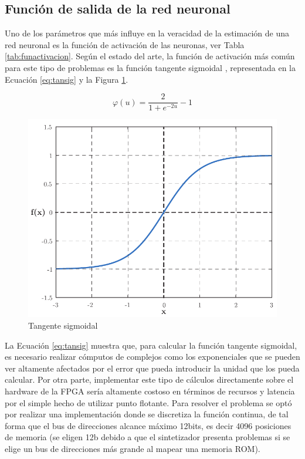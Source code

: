 \subsection{Función de salida de la red neuronal}

Uno de los parámetros que más influye en la veracidad de la estimación de una red neuronal es la función de activación de las neuronas, ver Tabla \ref{tab:funactivacion}. Según el estado del arte, la función de activación más común para este tipo de problemas es la función tangente sigmoidal \citep{floodfc1}, representada en la Ecuación \ref{eq:tansig} y la Figura \ref{fig:tansig}.

\begin{equation}\label{eq:tansig}
\varphi(u) = \dfrac{2}{1+e^{-2u}}-1
\end{equation}

\begin{figure}[H]
\centering
\includegraphics[scale=0.8]{./Figures/TANSIG.pdf}
\caption[Red neuronal en árbol]{Tangente sigmoidal}
\label{fig:tansig}
\end{figure}

La Ecuación \ref{eq:tansig} muestra que, para calcular la función tangente sigmoidal, es necesario realizar cómputos de complejos como los exponenciales que se pueden ver altamente afectados por el error que pueda introducir la unidad que los pueda calcular. Por otra parte, implementar este tipo de cálculos directamente sobre el hardware de la FPGA sería altamente costoso en términos de recursos y latencia por el simple hecho de utilizar punto flotante. Para resolver el problema se optó por realizar una implementación donde se discretiza la función continua, de tal forma que el bus de direcciones alcance máximo 12bits, es decir 4096 posiciones de memoria (se eligen 12b debido a que el sintetizador presenta problemas si se elige un bus de direcciones más grande al mapear una memoria ROM).

